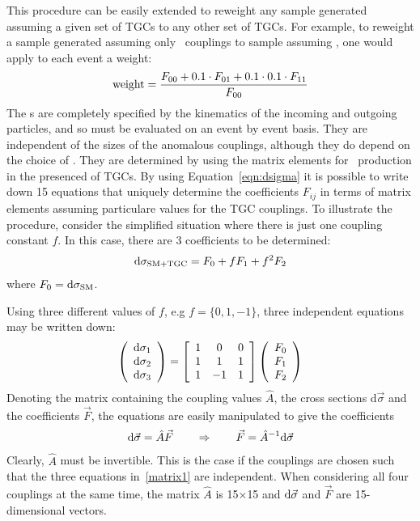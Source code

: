 This procedure can be easily extended to reweight any sample generated assuming
a given set of TGCs to any other set of TGCs. For example, to reweight a sample
generated assuming only \sm\ couplings to sample assuming , one would
apply to each event a weight:
\begin{eqnarray}\label{revisit}
{\rm weight} = \frac{F_{00} + 0.1 \cdot  F_{01} + 0.1\cdot 0.1 \cdot
F_{11}}{F_{00}}
\end{eqnarray}
The \Fij s are completely
specified by the kinematics of the incoming and outgoing particles, and so must
be evaluated on an event by event basis. They are
independent of the sizes of the anomalous couplings, although they do depend on
the choice of \formfactor. They are determined by using the matrix elements for
\ZZlll\ production in the presenced of TGCs. By using Equation~\ref{eqn:dsigma} it 
is possible to write down 15 equations that uniquely determine the 
coefficients $F_{ij}$ in terms of matrix elements assuming particulare values
for the TGC couplings.
To illustrate the procedure, consider the simplified situation where 
there is just one coupling constant $f$. In this case, there are 3 coefficients 
to be determined:
\begin{eqnarray}\label{revisit2}
{\rm d}\sigma_{\rm SM+TGC} = F_0 + fF_1 + f^2F_2 
\end{eqnarray}
where  $F_0={\rm d}\sigma_{\rm SM}$.

Using three different values of $f$, e.g $f=\{0,1,-1\}$, three independent
equations may be written down:
\begin{eqnarray}\label{matrix1}
\left(\begin{array}{c}
{\rm d}\sigma_1\\
{\rm d}\sigma_2\\
{\rm d}\sigma_3
\end{array}\right) =
\left[\begin{array}{ccc}
1 & 0 & 0 \\
1 & 1 & 1 \\
1 & -1 & 1
\end{array}\right]
\left(\begin{array}{c}
F_0\\
F_1\\
F_2
\end{array}\right)
\end{eqnarray}
Denoting the matrix containing the coupling values $\hat{A}$, the cross sections
d$\vec{\sigma}$ and the coefficients $\vec{F}$, the equations are easily
manipulated to give the coefficients 
\begin{eqnarray}\label{matrix2} {\rm
d}\vec{\sigma}=\hat{A}\vec{F} \qquad \Rightarrow \qquad \vec{F}=\hat{A}^{-1}{\rm
d}\vec{\sigma} 
\end{eqnarray} 
Clearly, $\hat{A}$ must be invertible. This is the
case if the couplings are chosen such that the three equations in~\ref{matrix1}
are independent. When considering all four couplings at the same time, the
matrix $\hat{A}$ is 15$\times$15 and ${\rm d}\vec{\sigma}$ and $\vec{F}$ are
15-dimensional vectors.


